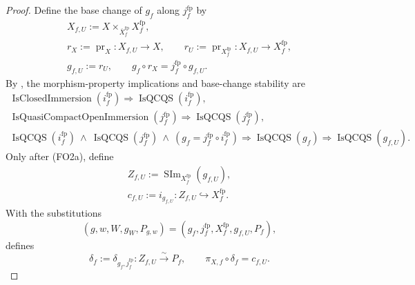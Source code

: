 \begin{proof}
  Define the base change of $g_f$ along $j_f^{\mathrm{fp}}$ by
  \[
  \begin{gathered}
    X_{f,U}:=X\times_{\overline X_f^{\mathrm{fp}}}
      X_f^{\mathrm{fp}},\\
    r_X:=\operatorname{pr}_X\colon X_{f,U}\to X,
    \qquad
    r_U:=\operatorname{pr}_{X_f^{\mathrm{fp}}}
      \colon X_{f,U}\to X_f^{\mathrm{fp}},\\
    g_{f,U}:=r_U,
    \qquad
    g_f\circ r_X=j_f^{\mathrm{fp}}\circ g_{f,U}.
  \end{gathered}                                                    \tag{FO2}
  \]
  By
  ,
  the morphism-property implications and base-change stability are
  \[
  \begin{gathered}
    \operatorname{IsClosedImmersion}(i_f^{\mathrm{fp}})
      \Longrightarrow\operatorname{IsQCQS}(i_f^{\mathrm{fp}}),\\
    \operatorname{IsQuasiCompactOpenImmersion}(j_f^{\mathrm{fp}})
      \Longrightarrow\operatorname{IsQCQS}(j_f^{\mathrm{fp}}),\\
    \operatorname{IsQCQS}(i_f^{\mathrm{fp}})
      \ \wedge\ \operatorname{IsQCQS}(j_f^{\mathrm{fp}})
      \ \wedge\ (g_f=j_f^{\mathrm{fp}}\circ i_f^{\mathrm{fp}})
      \Longrightarrow\operatorname{IsQCQS}(g_f)
      \Longrightarrow\operatorname{IsQCQS}(g_{f,U}).
  \end{gathered}                                                    \tag{FO2a}
  \]
  Only after (FO2a), define
  \[
  \begin{gathered}
    Z_{f,U}:=\operatorname{SIm}_{X_f^{\mathrm{fp}}}(g_{f,U}),\\
    c_{f,U}:=i_{g_{f,U}}\colon Z_{f,U}\hookrightarrow X_f^{\mathrm{fp}}.
  \end{gathered}                                                    \tag{FO2b}
  \]
  With the substitutions
  \[
    (g,w,W,g_W,P_{g,w})
      =(g_f,j_f^{\mathrm{fp}},X_f^{\mathrm{fp}},g_{f,U},P_f),
  \]
   defines
  \[
    \delta_f:=\delta_{g_f,j_f^{\mathrm{fp}}}
      \colon Z_{f,U}\xrightarrow{\sim}P_f,
    \qquad
    \pi_{X,f}\circ\delta_f=c_{f,U}.                              \tag{FO3}
  \]


\end{proof}
